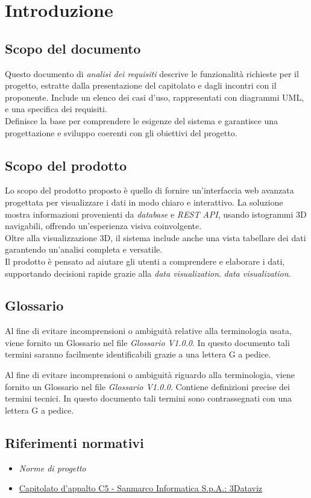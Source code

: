 \section{Introduzione}
\subsection{Scopo del documento}
Questo documento di \textit{analisi dei requisiti} descrive le funzionalità richieste per il progetto, estratte dalla presentazione del capitolato e dagli incontri con il proponente. 
Include un elenco dei casi d'uso, rappresentati con diagrammi UML, e una specifica dei requisiti.\\
Definisce la base per comprendere le esigenze del sistema e garantisce una progettazione e sviluppo coerenti con gli obiettivi del progetto.
\subsection{Scopo del prodotto}
Lo scopo del prodotto proposto è quello di fornire un'interfaccia web avanzata progettata per visualizzare i dati in modo chiaro e interattivo.
La soluzione mostra informazioni provenienti da \textit{database} e \textit{REST API}, usando istogrammi 3D navigabili, offrendo un'esperienza visiva coinvolgente.\\
Oltre alla visualizzazione 3D, il sistema include anche una vista tabellare dei dati garantendo un'analisi completa e versatile.\\
Il prodotto è pensato ad aiutare gli utenti a comprendere e elaborare i dati, supportando decisioni rapide grazie alla \textit{data visualization}.
\textit{data visualization}.
\subsection{Glossario}
Al fine di evitare incomprensioni o ambiguità relative alla terminologia
usata, viene fornito un Glossario nel file
\textit{Glossario V1.0.0}. In questo documento tali termini saranno facilmente identificabili
grazie a una lettera G a pedice.

Al fine di evitare incomprensioni o ambiguità riguardo alla terminologia, viene fornito un Glossario nel file \textit{Glossario V1.0.0}. Contiene definizioni precise dei termini tecnici. In questo documento tali termini sono contrassegnati con una lettera G a pedice.
\subsection{Riferimenti normativi}
\begin{itemize}
      \item {\textit{Norme di progetto}}
      \item \href{https://www.math.unipd.it/~tullio/IS-1/2024/Progetto/C5.pdf}
            {Capitolato d'appalto C5 - Sanmarco Informatica S.p.A.: 3Dataviz}
\end{itemize}
